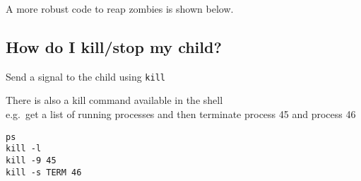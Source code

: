 A more robust code to reap zombies is shown below.

\begin{Shaded}
\begin{Highlighting}[]
  
   
   \NormalTok{), }\NormalTok{) \{\}}
\NormalTok{\}}
\end{Highlighting}
\end{Shaded}

\subsection{How do I kill/stop my
child?}\label{how-do-i-killstop-my-child}

Send a signal to the child using \texttt{kill}

\begin{Shaded}
\begin{Highlighting}[]
\end{Highlighting}
\end{Shaded}

There is also a kill command available in the shell\\e.g.~get a list of
running processes and then terminate process 45 and process 46

\begin{verbatim}
ps
kill -l 
kill -9 45
kill -s TERM 46
\end{verbatim}
